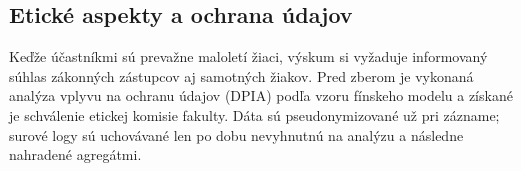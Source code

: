 \begin{aibar}
\section{Etické aspekty a ochrana údajov}
\label{sec:ethics}

Keďže účastníkmi sú prevažne maloletí žiaci, výskum si vyžaduje informovaný
súhlas zákonných zástupcov aj samotných žiakov. Pred zberom je vykonaná analýza
vplyvu na ochranu údajov (DPIA) podľa vzoru fínskeho modelu a získané je
schválenie etickej komisie fakulty. Dáta sú pseudonymizované už pri zázname;
surové logy sú uchovávané len po dobu nevyhnutnú na analýzu a následne
nahradené agregátmi.

\end{aibar}
